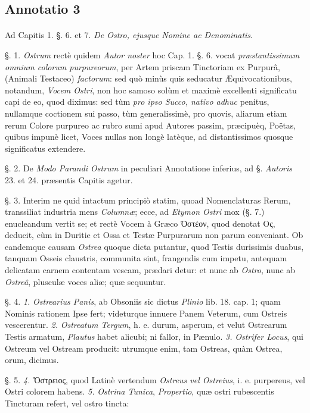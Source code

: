 \documentclass[a4paper, 11pt, oneside, polutonikogreek, german]{article}
\begin{document}
\subsection{Annotatio 3}
\paragraph{}
Ad Capitis 1. §. 6. et 7. \emph{De Ostro, ejusque Nomine ac Denominatis}.

§. 1. \emph{Ostrum} rectè quidem \emph{Autor noster} hoc Cap. 1. §. 6. vocat \emph{præstantissimum omnium colorum purpureorum}, per Artem priscam Tinctoriam ex Purpurâ, (Animali Testaceo) \emph{factorum}: sed quò minùs quis seducatur Æquivocationibus, notandum, \emph{Vocem Ostri}, non hoc samoso solùm et maximè excellenti significatu capi de eo, quod diximus: sed tùm \emph{pro ipso Succo, nativo adhuc} penitus, nullamque coctionem sui passo, tùm generalissimè, pro quovis, aliarum etiam rerum Colore purpureo ac rubro sumi apud Autores passim, præcipuèq, Poëtas, quibus impunè licet, Voces nullas non longè latèque, ad distantissimos quosque significatus extendere.

§. 2. De \emph{Modo Parandi Ostrum} in peculiari Annotatione inferius, ad §. \emph{Autoris} 23. et 24. præsentis Capitis agetur.

§. 3. Interim ne quid intactum principiò statim, quoad Nomenclaturas Rerum, transsiliat industria mens \emph{Columnæ}; ecce, ad \emph{Etymon Ostri} mox (§. 7.) enucleandum vertit se; et rectè Vocem à Græco Ὀστέον, quod denotat Ος, deducit, cùm in Duritie et Ossa et Testæ Purpurarum non parum conveniant. Ob eandemque causam \emph{Ostrea} quoque dicta putantur, quod Testis durissimis duabus, tanquam Osseis claustris, communita sint, frangendis cum impetu, antequam delicatam carnem contentam vescam, prædari detur: et nunc ab \emph{Ostro}, nunc ab \emph{Ostreâ}, plusculæ voces aliæ; quæ sequuntur.

§. 4. \emph{1.} \emph{Ostrearius Panis}, ab Obsoniis sic dictus \emph{Plinio} lib. 18. cap. 1; quam Nominis rationem Ipse fert; videturque innuere Panem Veterum, cum Ostreis vescerentur. \emph{2.} \emph{Ostreatum Tergum}, h. e. durum, asperum, et velut Ostrearum Testis armatum, \emph{Plautus} habet alicubi; ni fallor, in Pænulo. \emph{3.} \emph{Ostrifer Locus}, qui Ostreum vel Ostream producit: utrumque enim, tam Ostreas, quàm Ostrea, orum, dicimus.

§. 5. \emph{4.} Ὄστρειος, quod Latinè vertendum \emph{Ostreus vel Ostreius}, i. e. purpereus, vel Ostri colorem habens. \emph{5.} \emph{Ostrina Tunica}, \emph{Propertio}, quæ ostri rubescentis Tincturam refert, vel ostro tincta:
\end{document}
